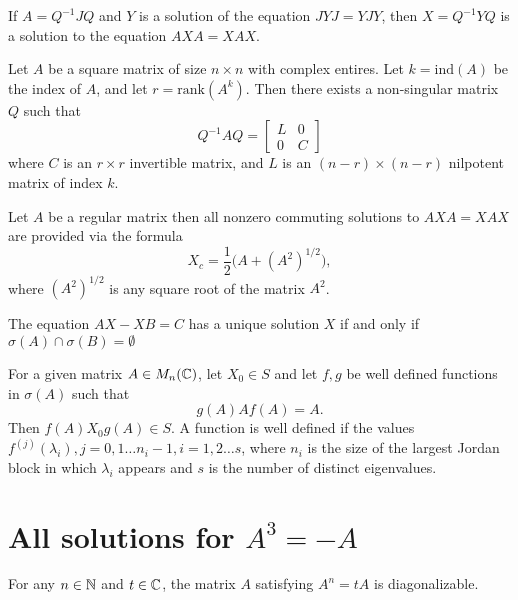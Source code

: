 \documentclass{article}
\begin{document}
\begin{theorem} \label{similarity}
  If $A = Q^{-1} J Q$ and $Y$ is a solution of the equation $J Y J = Y J Y$, then $X = Q^{-1} Y Q$ is a solution to the equation $A X A = X A X$.
\end{theorem}

\begin{theorem} \label{core-nilpotent}
Let $A$ be a square matrix of size $n \times n$ with complex entires. Let $k = \mathrm{ind}(A)$ be the index of $A$, and let $r = \mathrm{rank}(A^k)$. Then there exists a non-singular matrix $Q$ such that
\[
Q^{-1}AQ = 
\begin{bmatrix}
    L & 0 \\
    0 & C
\end{bmatrix}
\]
where $C$ is an $r \times r$ invertible matrix, and $L$ is an $(n-r) \times (n-r)$ nilpotent matrix of index $k$.
\end{theorem}

\begin{theorem} \label{invertible}
  Let $A$ be a regular matrix then all nonzero commuting solutions to $A X A = X A X$ are provided via the formula
  \[X_c = \frac{1}{2} \bigl( A + (A^2)^{1/2} \bigl),\]
  where $(A^2)^{1/2}$ is any square root of the matrix $A^2$.
\end{theorem}

\begin{theorem} \label{Sylverster-equation}
  The equation $AX - XB = C$ has a unique solution $X$ if and only if $\sigma (A) \cap \sigma (B) = \emptyset$
\end{theorem}

\begin{theorem} \label{generating-solutions}
  For a given matrix $A \in M_n (\mathbb{C})$, let $X_0 \in S$ and let $f, g$ be well defined functions in $\sigma (A)$ such that
  \[g(A) A f(A) = A.\]
  Then $f(A) X_0 g(A) \in S$.
  A function is well defined if the values $f^{(j)} (\lambda_i), j = 0, 1 \ldots n_i - 1, i = 1, 2 \ldots s$, where $n_i$ is the size of the largest Jordan block in which $\lambda_i$ appears and $s$ is the number of distinct eigenvalues.
\end{theorem}

\section{All solutions for $A^3 = -A$}

\begin{theorem} \label{periodic-diagonal}
  For any $n \in \mathbb{N}$ and $t \in \mathbb{C}$, the matrix $A$ satisfying $A^n = t A$ is diagonalizable.
\end{theorem}
\end{document}
